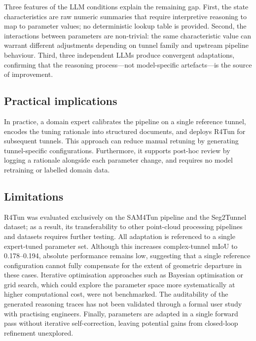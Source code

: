 \documentclass[a4paper,fleqn]{cas-dc}
\begin{document}
Three features of the LLM conditions explain the remaining gap. First, the state characteristics are raw numeric summaries that require interpretive reasoning to map to parameter values; no deterministic lookup table is provided. Second, the interactions between parameters are non-trivial: the same characteristic value can warrant different adjustments depending on tunnel family and upstream pipeline behaviour. Third, three independent LLMs produce convergent adaptations, confirming that the reasoning process---not model-specific artefacts---is the source of improvement.

\subsection{Practical implications}
In practice, a domain expert calibrates the pipeline on a single reference tunnel, encodes the tuning rationale into structured documents, and deploys R4Tun for subsequent tunnels. This approach can reduce manual retuning by generating tunnel-specific configurations. Furthermore, it supports post-hoc review by logging a rationale alongside each parameter change, and requires no model retraining or labelled domain data.

\subsection{Limitations}\label{sec:limitations}

R4Tun was evaluated exclusively on the SAM4Tun pipeline and the Seg2Tunnel dataset; as a result, its transferability to other point-cloud processing pipelines and datasets requires further testing. All adaptation is referenced to a single expert-tuned parameter set. Although this increases complex-tunnel mIoU to 0.178--0.194, absolute performance remains low, suggesting that a single reference configuration cannot fully compensate for the extent of geometric departure in these cases. Iterative optimisation approaches such as Bayesian optimisation or grid search, which could explore the parameter space more systematically at higher computational cost, were not benchmarked. The auditability of the generated reasoning traces has not been validated through a formal user study with practising engineers. Finally, parameters are adapted in a single forward pass without iterative self-correction, leaving potential gains from closed-loop refinement unexplored.


\end{document}
